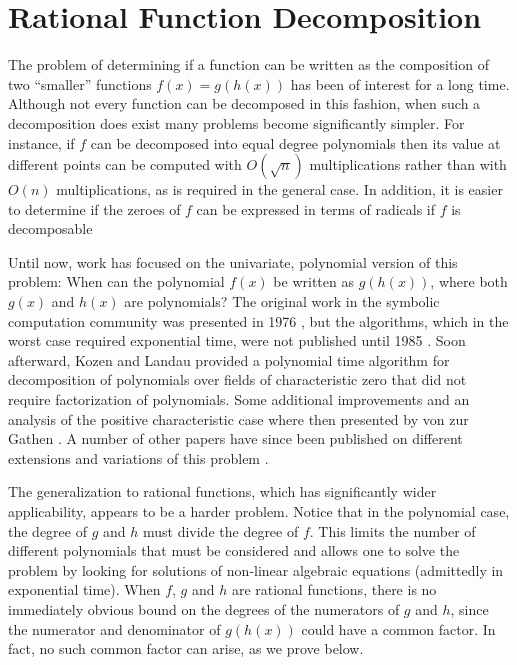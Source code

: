 \chapter{Rational Function Decomposition}
\label{RatDecomp:Chap}

The problem of determining if a function can be written as the
composition of two ``smaller'' functions $f(x) = g(h(x))$ has been of
interest for a long time.  Although not every function can be
decomposed in this fashion, when such a decomposition does exist many
problems become significantly simpler.  For instance, if $f$ can be
decomposed into equal degree polynomials then its value at different
points can be computed with $O(\sqrt{n})$ multiplications rather than
with $O(n)$ multiplications, as is required in the general case.  In
addition, it is easier to determine if the zeroes of $f$ can be
expressed in terms of radicals if $f$ is decomposable

Until now, work has focused on the univariate, polynomial version of
this problem: When can the polynomial $f(x)$ be written as $g(h(x))$,
where both $g(x)$ and $h(x)$ are polynomials?  The original work in
the symbolic computation community was presented in 1976
\cite{Barton76}, but the algorithms, which in the worst case
required exponential time, were not published until 1985
\cite{Barton1985-hz}.  Soon afterward, Kozen and Landau
\cite{Kozen89} provided a polynomial time algorithm for
decomposition of polynomials over fields of characteristic zero that
did not require factorization of polynomials.  Some additional
improvements and an analysis of the positive characteristic case where
then presented by von zur Gathen \cite{Gathen87,Gathen90a}. A number
of other papers have since been published on different extensions and
variations of this problem
\cite{Alagar85,Gutierrez89,Dickerson89a,Dickerson89b}. 

The generalization to rational functions, which has significantly
wider applicability, appears to be a harder problem.  Notice that in
the polynomial case, the degree of $g$ and $h$ must divide the degree
of $f$.  This limits the number of different polynomials that must be
considered and allows one to solve the problem by looking for
solutions of non-linear algebraic equations (admittedly in exponential
time).  When $f$, $g$ and $h$ are rational functions, there is no
immediately obvious bound on the degrees of the numerators of $g$ and
$h$, since the numerator and denominator of $g(h(x))$ could have a
common factor.  In fact, no such common factor can arise, as we prove
below.

